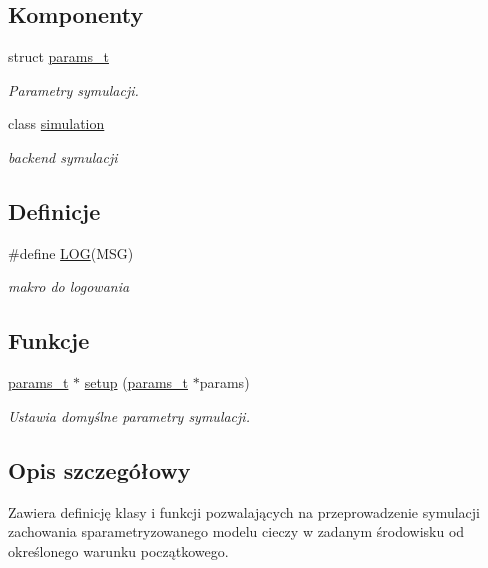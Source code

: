 \subsection*{Komponenty}
\begin{DoxyCompactItemize}
\item 
struct \hyperlink{structparams__t}{params\-\_\-t}
\begin{DoxyCompactList}\small\item\em Parametry symulacji. \end{DoxyCompactList}\item 
class \hyperlink{classsimulation}{simulation}
\begin{DoxyCompactList}\small\item\em backend symulacji \end{DoxyCompactList}\end{DoxyCompactItemize}
\subsection*{Definicje}
\begin{DoxyCompactItemize}
\item 
\#define \hyperlink{simulation_8hh_acbd91a8a9a62657e2252a0a1f7c876e1}{L\-O\-G}(M\-S\-G)
\begin{DoxyCompactList}\small\item\em makro do logowania \end{DoxyCompactList}\end{DoxyCompactItemize}
\subsection*{Funkcje}
\begin{DoxyCompactItemize}
\item 
\hyperlink{structparams__t}{params\-\_\-t} $\ast$ \hyperlink{simulation_8hh_abf5adaaaf59fb394dd7b3c5d4bcaaa1a}{setup} (\hyperlink{structparams__t}{params\-\_\-t} $\ast$params)
\begin{DoxyCompactList}\small\item\em Ustawia domyślne parametry symulacji. \end{DoxyCompactList}\end{DoxyCompactItemize}


\subsection{Opis szczegółowy}
Zawiera definicję klasy i funkcji pozwalających na przeprowadzenie symulacji zachowania sparametryzowanego modelu cieczy w zadanym środowisku od określonego warunku początkowego. 

